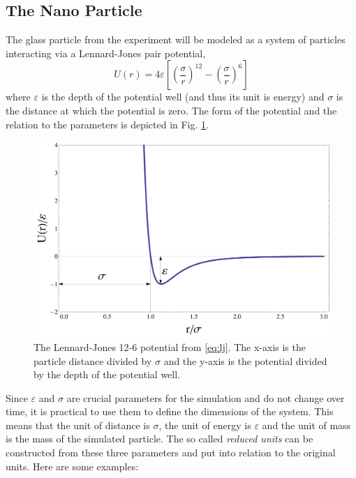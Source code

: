 \documentclass[12pt]{article}
\begin{document}
\subsection{The Nano Particle}
The glass particle from the experiment will be modeled as a system of particles interacting via a Lennard-Jones pair potential, 
\begin{equation}
    \label{eq:lj}
    U(r) = 4\varepsilon\left[\left(\frac\sigma r\right)^{12} - \left(\frac\sigma r\right)^6\right]
\end{equation}
where $\varepsilon$ is the depth of the potential well (and thus its unit is energy) and $\sigma$ is the distance at which the potential is zero. 
The form of the potential and the relation to the parameters is depicted in Fig. \ref{fig:lj}.
\begin{figure}[h]
    \begin{center}
        \includegraphics[scale=0.2]{images/LJ-2.pdf}
        \caption{The Lennard-Jones 12-6 potential from \eqref{eq:lj}. The x-axis is the particle distance divided by $\sigma$ and  the y-axis is the
        potential divided by the depth of the potential well.}
        \label{fig:lj}
    \end{center}
\end{figure}
Since $\varepsilon$ and $\sigma$ are crucial parameters for the simulation and do not change over time, it is practical to use them to
define the dimensions of the system. This means that the unit of distance is $\sigma$, the unit of energy is $\varepsilon$ and the unit of mass is 
the mass of the simulated particle. The so called \textit{reduced units} can be constructed from these three parameters and put into relation to the
original units. Here are some examples:
\end{document}
